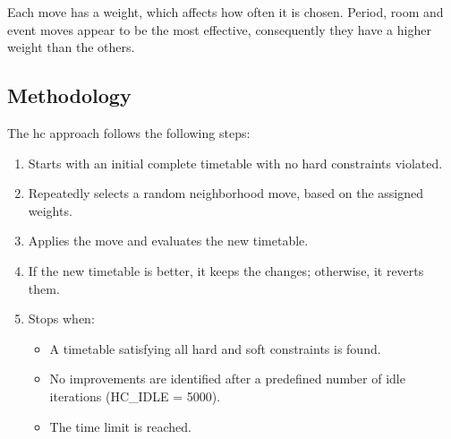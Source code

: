 Each move has a weight, which affects how often it is chosen. Period, room and event moves appear to be the most effective, consequently they have a higher weight than the others.

\subsection{Methodology}

The \ac{hc} approach follows the following steps:

\begin{enumerate}
\item Starts with an initial complete timetable with no hard constraints violated.
\item Repeatedly selects a random neighborhood move, based on the assigned weights.
\item Applies the move and evaluates the new timetable.
\item If the new timetable is better, it keeps the changes; otherwise, it reverts them.
\item Stops when:
	\begin{itemize}
	\item A timetable satisfying all hard and soft constraints is found.
	\item No improvements are identified after a predefined number of idle iterations (HC\_IDLE = 5000).
	\item The time limit is reached.
	\end{itemize}
\end{enumerate}

